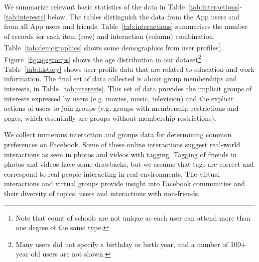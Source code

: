 
We summarize relevant basic statistics of the data in Table~\ref{tab:interactions}-\ref{tab:interests} below.
The tables distinguish the data from the App users and from
all App users and friends. Table~\ref{tab:interactions}
summarises the number of records for each item (row) and interaction (column)
combination. Table~\ref{tab:demographics} shows 
some demographics from user profiles\footnote{Note that
count of schools are not unique as each user can attend more than one
degree of the same type.}. Figure~\ref{fig:agegroups} shows the age distribution in our dataset\footnote{Many users did not specify a birthday or birth year, and a number of 100+ year old users are not shown.}. Table~\ref{tab:history} shows user profile data that are related to education and work information. 
The final
set of data collected is about group memberships and interests, in Table~\ref{tab:interests}.
This set of data provides the
implicit groups of interests expressed by users (e.g. movies,
music, television) and the explicit actions of users to join groups (e.g. groups
with membership restrictions and pages, which essentially are groups
without membership restrictions).

We collect numerous interaction and groups data for determining common preferences on Facebook. Some of these online interactions suggest real-world interactions as seen in photos and videos with tagging. Tagging of friends in photos and videos have some drawbacks, but we assume that tags are correct and correspond to real people interacting in real environments. The virtual interactions and virtual groups provide insight into Facebook communities and their diversity of topics, users and interactions with non-friends.


